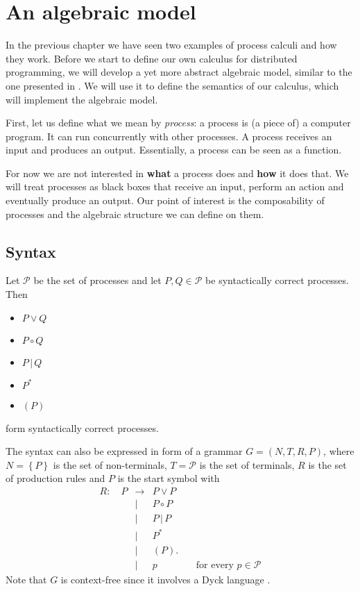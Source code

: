 \chapter{An algebraic model}
\label{chp:algebraic_model}
In the previous chapter we have seen two examples of process calculi and how they work. Before we start to define our own calculus for distributed programming, we will develop a yet more abstract algebraic model, similar to the one presented in \cite{Hoare:2012:LPU:2368298.2368301}. We will use it to define the semantics of our calculus, which will implement the algebraic model.

First, let us define what we mean by \textit{process}: a process is (a piece of) a computer program. It can run concurrently with other processes. A process receives an input and produces an output. Essentially, a process can be seen as a function. %

For now we are not interested in \textbf{what} a process does and \textbf{how} it does that. We will treat processes as black boxes that receive an input, perform an action and eventually produce an output. Our point of interest is the composability of processes and the algebraic structure we can define on them.

\section{Syntax}

Let $\mathcal{P}$ be the set of processes and let $P, Q \in \mathcal{P}$ be syntactically correct processes. Then
\begin{itemize}
  \item $P \vee Q$
  \vspace*{-0.25em}
  \item $P \circ Q$
  \vspace*{-0.25em}
  \item $P \,|\, Q$
  \vspace*{-0.25em}
  \item $P^*$
  \vspace*{-0.25em}
  \item $\left( P \right)$
\end{itemize}
form syntactically correct processes.

The syntax can also be expressed in form of a grammar $G = \left( N, T, R, P \right)$, where $N = \left\{ P \right\}$ is the set of non-terminals, $T = \mathcal{P}$ is the set of terminals, $R$ is the set of production rules and $P$ is the start symbol \cite{Hopcroft:2006:IAT:1196416} with %
\begin{eqnarray*}
  R \colon \quad P & \to & P \vee P \\
    & | & P \circ P \\
    & | & P \,|\, P \\
    & | & P^* \\
    & | & \left( P \right). \\
    & | & p \quad\quad\quad\quad \text{for every } p \in \mathcal{P}
\end{eqnarray*}
Note that $G$ is context-free since it involves a Dyck language \cite{}.

